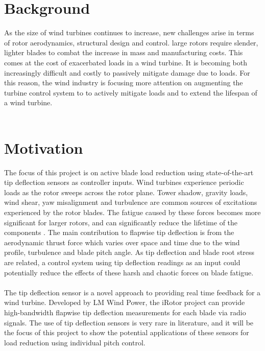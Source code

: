 \section{Background}
As the size of wind turbines continues to increase, new challenges arise in terms of rotor aerodynamics, structural design and control. large rotors require slender, lighter blades to combat the increase in mass and manufacturing costs. This comes at the cost of exacerbated loads in a wind turbine. It is becoming both increasingly difficult and costly to passively mitigate damage due to loads. For this reason, the wind industry is focusing more attention on augmenting the turbine control system to to actively mitigate loads and to extend the lifespan of a wind turbine. 
\\~\\
\section{Motivation}
The focus of this project is on active blade load reduction using state-of-the-art tip deflection sensors as controller inputs. Wind turbines experience periodic loads as the rotor sweeps across the rotor plane. Tower shadow, gravity loads, wind shear, yaw misalignment and turbulence are common sources of excitations experienced by the rotor blades. The fatigue caused by these forces becomes more significant for larger rotors, and can significantly reduce the lifetime of the components \citep{2_Kanev}. The main contribution to flapwise tip deflection is from the aerodynamic thrust force which varies over space and time due to the wind profile, turbulence and blade pitch angle. As tip deflection and blade root stress are related, a control system using tip deflection readings as an input could potentially reduce the effects of these harsh and chaotic forces on blade fatigue. 
\\~\\
The tip deflection sensor is a novel approach to providing real time feedback for a wind turbine. Developed by LM Wind Power, the iRotor project can provide high-bandwidth flapwise tip deflection measurements for each blade via radio signals. The use of tip deflection sensors is very rare in literature, and it will be the focus of this project to show the potential applications of these sensors for load reduction using individual pitch control.

